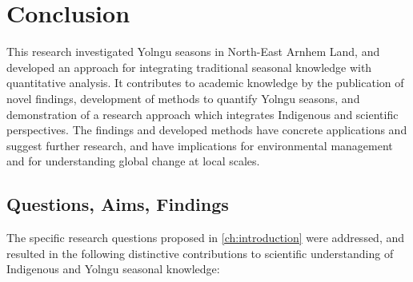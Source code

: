 \chapter{Conclusion}
\label{ch:conclusion}

This research investigated Yolngu seasons in North-East Arnhem Land, and
developed an approach for integrating traditional seasonal knowledge with
quantitative analysis.
%
It contributes to academic knowledge by the publication of novel findings,
development of methods to quantify Yolngu seasons, and demonstration
of a research approach which integrates Indigenous and scientific perspectives.
%
The findings and developed methods have concrete applications and suggest
further research, and have implications for environmental management and
for understanding global change at local scales.


\section{Questions, Aims, Findings}

The specific research questions proposed in \cref{ch:introduction} were addressed,
and resulted in the following distinctive contributions to scientific understanding
of Indigenous and Yolngu seasonal knowledge:


